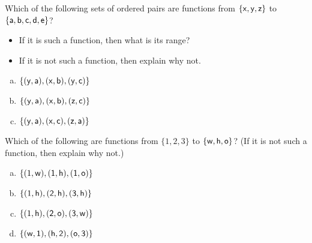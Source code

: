 \begin{exercise}{}
 Which of the following sets of ordered pairs are functions from
$\{\sf{x}, \sf{y}, \sf{z}\}$ to $\{\sf{a},\sf{b},\sf{c},\sf{d},\sf{e}\}$? 
\begin{itemize}
\item If it is such a function, then what is its range? 
\item If it is not such a function, then explain why not.
\end{itemize}
\begin{enumerate}[(a)]
\item \label{FunctionsChapExers-Whichxy-yaxbyc}
$\{(\sf{y}, \sf{a}), (\sf{x}, \sf{b}), (\sf{y},\sf{c})\}$
\item \label{FunctionsChapExers-Whichxy-yaxbzc}
$\{(\sf{y}, \sf{a}), (\sf{x},\sf{b}), (\sf{z},\sf{c})\}$
\item \label{FunctionsChapExers-Whichxy-yaxcza}
$\{(\sf{y}, \sf{a}), (\sf{x},\sf{c}), (\sf{z},\sf{a})\}$
\end{enumerate}
\end{exercise}

\begin{exercise}{}
 Which of the following are functions from
$\{1, 2, 3\}$ to $\{\sf{w},\sf{h},\sf{o}\}$?
(If it is not such a function, then explain why not.)
\begin{multicols}{2}
\begin{enumerate}[(a)]
\item \label{FunctionsChapExers-Which123-1w1h1o}
$\{(1, \sf{w}), (1, \sf{h}), (1,\sf{o})\}$
\item \label{FunctionsChapExers-Which123-1h2h3h}
$\{(1, \sf{h}), (2,\sf{h}), (3,\sf{h})\}$
\item \label{FunctionsChapExers-Which123-1h2o3w}
$\{(1, \sf{h}), (2,\sf{o}), (3,\sf{w})\}$
\item \label{FunctionsChapExers-Which123-w1h2o3}
$\{(\sf{w},1), (\sf{h},2), (\sf{o},3)\}$
\end{enumerate}
\end{multicols}
\end{exercise}

